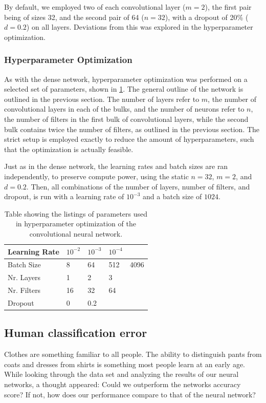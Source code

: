 \documentclass[10pt, twocolumn]{article}
\begin{document}
By default, we employed two of each convolutional layer ($m=2$), the first pair being of sizes 32, and the second pair of 64 ($n=32$), with a dropout of 20\% ($d=0.2$) on all layers. Deviations from this was explored in the hyperparameter optimization.

\subsubsection{Hyperparameter Optimization}
\label{sec:method_CNN_hp}
As with the dense network, hyperparameter optimization was performed on a selected set of parameters, shown in \cref{tab:hp_table_CNN}. The general outline of the network is outlined in the previous section. The number of layers refer to $m$, the number of convolutional layers in each of the bulks, and the number of neurons refer to $n$, the number of filters in the first bulk of convolutional layers, while the second bulk contains twice the number of filters, as outlined in the previous section. The strict setup is employed exactly to reduce the amount of hyperparameters, such that the optimization is actually feasible.

Just as in the dense network, the learning rates and batch sizes are ran independently, to preserve compute power, using the static $n=32$, $m=2$, and $d=0.2$. Then, all combinations of the number of layers, number of filters, and dropout, is run with a learning rate of $10^{-3}$ and a batch size of $1024$.

\begin{table}[H]
    \centering
    \begin{tabular}{l|l l l l}
        Learning Rate & $10^{-2}$ & $10^{-3}$ & $10^{-4}$ & \\
        \hline
        Batch Size & 8 & 64 & 512 & 4096 \\
        \hline
        Nr. Layers & 1 & 2 & 3 & \\
        \hline
        Nr. Filters & 16 & 32 & 64 & \\
        \hline 
        Dropout & 0 & 0.2 & & 
    \end{tabular}
    \caption{Table showing the listings of parameters used in hyperparameter optimization of the convolutional neural network.}
    \label{tab:hp_table_CNN}
\end{table}

\subsection{Human classification error}
Clothes are something familiar to all people. The ability to distinguish pants from coats and dresses from shirts is something most people learn at an early age. While looking through the data set and analyzing the results of our neural networks, a thought appeared: Could we outperform the networks accuracy score? If not, how does our performance compare to that of the neural network?
\end{document}
